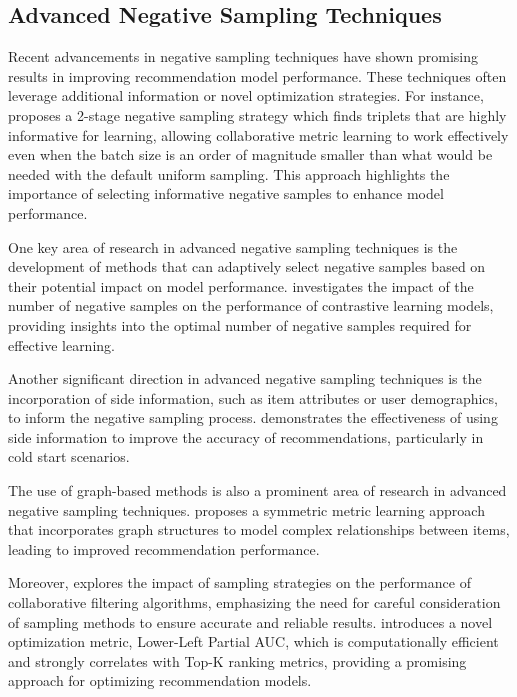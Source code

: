 \documentclass[11pt,a4paper]{article}
\begin{document}
\subsection{Advanced Negative Sampling Techniques}


Recent advancements in negative sampling techniques have shown promising results in improving recommendation model performance. These techniques often leverage additional information or novel optimization strategies. For instance, \cite{doi:10.1145/3331184.3331337} proposes a 2-stage negative sampling strategy which finds triplets that are highly informative for learning, allowing collaborative metric learning to work effectively even when the batch size is an order of magnitude smaller than what would be needed with the default uniform sampling. This approach highlights the importance of selecting informative negative samples to enhance model performance.

One key area of research in advanced negative sampling techniques is the development of methods that can adaptively select negative samples based on their potential impact on model performance. \cite{doi:10.24963/ijcai.2022/348} investigates the impact of the number of negative samples on the performance of contrastive learning models, providing insights into the optimal number of negative samples required for effective learning. 

Another significant direction in advanced negative sampling techniques is the incorporation of side information, such as item attributes or user demographics, to inform the negative sampling process. \cite{doi:10.1016/j.knosys.2011.07.021} demonstrates the effectiveness of using side information to improve the accuracy of recommendations, particularly in cold start scenarios. 

The use of graph-based methods is also a prominent area of research in advanced negative sampling techniques. \cite{doi:10.1609/aaai.v34i04.5894} proposes a symmetric metric learning approach that incorporates graph structures to model complex relationships between items, leading to improved recommendation performance.

Moreover, \cite{doi:10.1145/3488560.3498439} explores the impact of sampling strategies on the performance of collaborative filtering algorithms, emphasizing the need for careful consideration of sampling methods to ensure accurate and reliable results. \cite{doi:10.1145/3589334.3645371} introduces a novel optimization metric, Lower-Left Partial AUC, which is computationally efficient and strongly correlates with Top-K ranking metrics, providing a promising approach for optimizing recommendation models.
\end{document}
